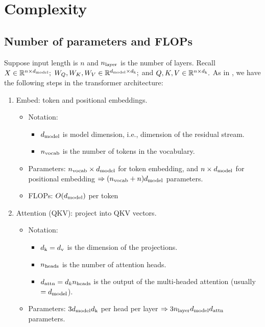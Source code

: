 \section{Complexity}

\subsection{Number of parameters and FLOPs}

Suppose input length is $n$ and $n_{\mathrm{layer}}$ is the number of layers. Recall $X \in \mathbb{R}^{n \times d_{\mathrm{model}}};$ $W_Q,W_K,W_V \in \mathbb{R}^{d_{\mathrm{model}} \times d_{\mathrm{k}}};$ and $Q,K,V \in \mathbb{R}^{n\times d_{\mathrm{k}}}.$ As in \cite{scaling_laws}, we have the following steps in the transformer architecture:
\begin{enumerate}
    \item Embed: token and positional embeddings.
        \begin{itemize}
            \item Notation:
            \begin{itemize}
                \item $d_{\mathrm{model}}$ is model dimension, i.e., dimension of the residual stream.
                \item $n_{\mathrm{vocab}}$ is the number of tokens in the vocabulary. 
            \end{itemize}
            \item Parameters: $n_{\mathrm{vocab}} \times d_{\mathrm{model}}$ for token embedding, and $n \times d_{\mathrm{model}}$ for positional embedding $\Rightarrow (n_{\mathrm{vocab}} + n)d_{\mathrm{model}}$ parameters.
            \item FLOPs: $O(d_{\mathrm{model}})$ per token
        \end{itemize}
    \item Attention (QKV): project into QKV vectors.
        \begin{itemize}
            \item Notation:
            \begin{itemize}
                \item $d_{\mathrm{k}} = d_{\mathrm{v}}$ is the dimension of the projections.
                \item $n_{\mathrm{heads}}$ is the number of attention heads.
                \item $d_{\mathrm{attn}} = d_kn_{\mathrm{heads}}$ is the output of the multi-headed attention (usually $=d_{\mathrm{model}}$).
            \end{itemize}
            \item Parameters: $3d_{\mathrm{model}} d_{\mathrm{k}}$ per head per layer $\Rightarrow 3n_{\mathrm{layer}} d_{\mathrm{model}} d_{\mathrm{attn}}$ parameters.

\end{itemize}
\end{enumerate}
